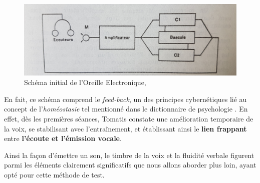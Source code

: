 \begin{figure}
	\centering
	\includegraphics[width=0.7\linewidth]{images/oreilleelectro.jpg}
	\caption[oreilleelectro]{Schéma initial de l'Oreille
          Electronique,\autocite[ch.~3, p.~97]{tomatis_oreille_1998}}

	\label{oreilleelectro}
\end{figure}
En fait, ce schéma comprend le\textit{ feed-back}, un des principes
cybernétiques lié au concept de l'\textit{homéostasie} tel
mentionné dans le dictionnaire de
psychologie \autocite[298]{doronparot}.
En effet, dès les premières
séances, Tomatis constate une amélioration temporaire de la voix, se
stabilisant avec l'entraînement, et établissant ainsi le
\textbf{lien frappant} entre\textbf{ l'écoute et
  l'émission vocale}.

Ainsi la façon d'émettre un son, le timbre de la voix et la fluidité
verbale figurent parmi les
éléments clairement significatifs que nous allons aborder plus loin, ayant opté pour
cette méthode de test.
